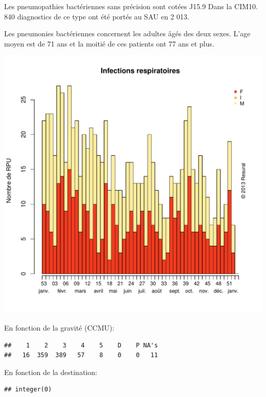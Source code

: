 \documentclass[12pt,english,french,twoside]{book}\usepackage[]{graphicx}\usepackage[]{color}
\makeatletter
\def\maxwidth{ %
  \ifdim\Gin@nat@width>\linewidth
    \linewidth
  \else
    \Gin@nat@width
  \fi
}
\newenvironment{kframe}{%
 \def\at@end@of@kframe{}%
 \ifinner\ifhmode%
  \def\at@end@of@kframe{\end{minipage}}%
  \begin{minipage}{\columnwidth}%
 \fi\fi%
 \def\FrameCommand##1{\hskip\@totalleftmargin \hskip-\fboxsep
 \colorbox{shadecolor}{##1}\hskip-\fboxsep
     \hskip-\linewidth \hskip-\@totalleftmargin \hskip\columnwidth}%
 \MakeFramed {\advance\hsize-\width
   \@totalleftmargin\z@ \linewidth\hsize
   \@setminipage}}%
 {\par\unskip\endMakeFramed%
 \at@end@of@kframe}
\newenvironment{knitrout}{}{} %
\makeatother
\begin{document}
Les pneumopathies bactériennes sans précision sont cotées J15.9 Dans la CIM10.
840 diagnostics de ce type ont été portés au SAU en 2 013.

Les pneumonies bactériennes concernent les adultes âgés des deux sexes. L'age moyen est de 71 ans et la moitié de ces patients ont 77 ans et plus.

\begin{knitrout}
\color{fgcolor}
\includegraphics[width=\maxwidth]{figure/pneumo} 

\end{knitrout}


En fonction de la gravité (CCMU):
\begin{knitrout}
\color{fgcolor}\begin{kframe}
\begin{verbatim}
##    1    2    3    4    5    D    P NA's 
##   16  359  389   57    8    0    0   11
\end{verbatim}
\end{kframe}
\end{knitrout}


En fonction de la destination:
\begin{knitrout}
\color{fgcolor}\begin{kframe}
\begin{verbatim}
## integer(0)
\end{verbatim}
\end{kframe}
\end{knitrout}
\end{document}
